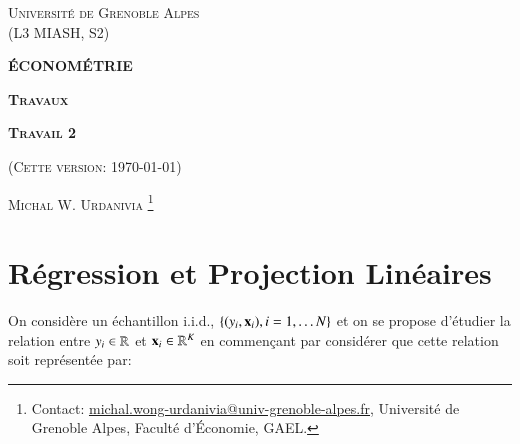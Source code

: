 \documentclass[10pt, reqno]{amsart}
\begin{document}
 
\usetikzlibrary{positioning}
\usetikzlibrary{snakes}
\usetikzlibrary{calc}
\usetikzlibrary{arrows}
\usetikzlibrary{decorations.markings}
\usetikzlibrary{shapes.misc}
\usetikzlibrary{shapes}

%

\begin{titlepage}
\centering
	{\scshape\Large \textsc{Université de Grenoble Alpes\\(L3 MIASH, S2)}\par}
	\vspace{0.5cm}
	{\Large\bfseries \scshape\Large \textsc{ÉCONOMÉTRIE}\par}
	\vspace{0.5cm}
	{\Large\bfseries \textsc{Travaux} \par}
    \vspace{0.5cm}   
   {\Large\bfseries \textsc{Travail 2} \par}
	\vspace{1cm}
	{(\textsc{Cette version: \today})\par}
	\vspace{1cm}
	{\large \textsc{Michal W. Urdanivia}
	\footnote{Contact:  
	\href{mailto:michal.wong-urdanivia@univ-grenoble-alpes.fr}{michal.wong-urdanivia@univ-grenoble-alpes.fr}, 
	 Université de Grenoble Alpes,  Faculté d'\'Economie, GAEL.}\par}
	
\end{titlepage}

\newpage

\tableofcontents

\newpage

\section{Régression et Projection Linéaires}

On considère un échantillon i.i.d., $\{(y_i, {\mathbf x}_i), i=1, \ldots N\}$ et on se propose d'étudier la relation entre $y_i\in \mathbb{R}$ 
et ${\mathbf x}_i\in\mathbb{R}^K$ en commençant par considérer que cette relation soit représentée par:
\end{document}
